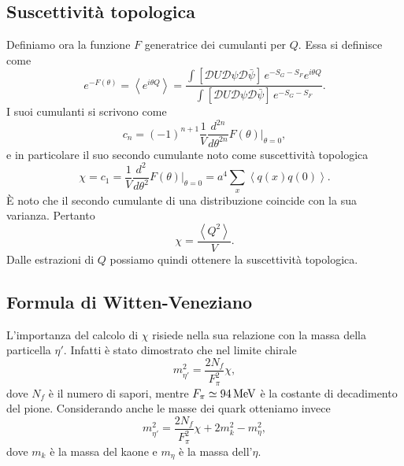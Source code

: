 \documentclass{article}
\numberwithin{equation}{subsection}
\begin{document}
\subsection{Suscettività topologica}
Definiamo ora la funzione $F$ generatrice dei cumulanti per $Q$. Essa si definisce come 
\begin{equation}
    e^{-F(\theta)}=\left< e^{i\theta Q}\right>=\frac{\int \left[\mathcal{D}U \mathcal{D}\psi \mathcal{D}\bar{\psi}\right] \, e^{-S_G-S_F}e^{i\theta Q}}{\int \left[\mathcal{D}U \mathcal{D}\psi \mathcal{D}\bar{\psi}\right] \, e^{-S_G-S_F}}.
\end{equation}
I suoi cumulanti si scrivono come 
\begin{equation}
    c_n=(-1)^{n+1}\frac{1}{V}\frac{d^{2n}}{d\theta^{2n}}\left.F(\theta)\right|_{\theta=0}, 
\end{equation}
e in particolare il suo secondo cumulante noto come suscettività topologica
\begin{equation}
    \chi=c_1=\frac{1}{V}\frac{d^2}{d\theta^2}\left.F(\theta)\right|_{\theta=0}=a^4\sum_x \left< q(x)q(0)\right>.
\end{equation}
È noto che il secondo cumulante di una distribuzione coincide con la sua varianza. Pertanto 
\begin{equation}
    \chi=\frac{\left< Q^2\right>}{V}.
\end{equation}
Dalle estrazioni di $Q$ possiamo quindi ottenere la suscettività topologica.

\subsection{Formula di Witten-Veneziano}

L'importanza del calcolo di $\chi$ risiede nella sua relazione con la massa della particella $\eta'$. Infatti è stato dimostrato che nel limite chirale 
\begin{equation}
    m^2_{\eta'}=\frac{2N_f}{F_\pi^2}\chi,
\end{equation} 
dove $N_f$ è il numero di sapori, mentre $F_\pi\simeq 94\, \textup{MeV}$ è la costante di decadimento del pione. Considerando anche le masse dei quark otteniamo invece 
\begin{equation}
    \label{witten Veneziano}
    m^2_{\eta'}=\frac{2N_f}{F_\pi^2}\chi+2m_k^2-m_\eta^2,
\end{equation} 
dove $m_k$ è la massa del kaone e $m_\eta$ è la massa dell'$\eta$.
\end{document}
